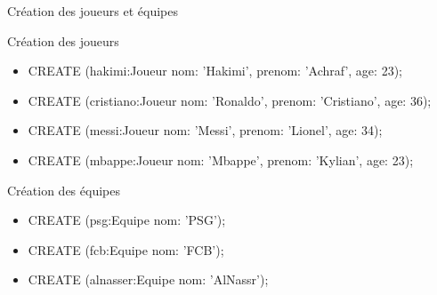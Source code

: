\begin{frame}{Création des joueurs et équipes}
  \begin{block}{Création des joueurs}
    \begin{itemize}
    \small
      \item CREATE (hakimi:Joueur {nom: 'Hakimi', prenom: 'Achraf', age: 23});
      \item CREATE (cristiano:Joueur {nom: 'Ronaldo', prenom: 'Cristiano', age: 36});
      \item CREATE (messi:Joueur {nom: 'Messi', prenom: 'Lionel', age: 34});
      \item CREATE (mbappe:Joueur {nom: 'Mbappe', prenom: 'Kylian', age: 23});
    \end{itemize}
  \end{block}

  \begin{block}{Création des équipes}
    \begin{itemize}
      \item CREATE (psg:Equipe {nom: 'PSG'});
      \item CREATE (fcb:Equipe {nom: 'FCB'});
      \item CREATE (alnasser:Equipe {nom: 'AlNassr'});
    \end{itemize}
  \end{block}
\end{frame}